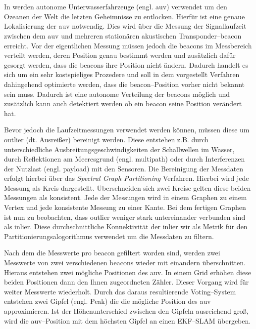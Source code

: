 \section{}

In \cite{olson2004robust} werden autonome Unterwasserfahrzeuge (engl. \gls{auv}) verwendet um den Ozeanen der Welt die letzten Geheimnisse zu entlocken. Hierfür ist eine genaue Lokalisierung der \gls{auv} notwendig. Dies wird über die Messung der Signallaufzeit zwischen dem \gls{auv} und mehreren stationären akustischen Transponder--\Gls{beacon} erreicht. Vor der eigentlichen Messung müssen jedoch die \Glspl{beacon} im Messbereich verteilt werden, deren Position genau bestimmt werden und zusätzlich dafür gesorgt werden, dass die \Glspl{beacon} ihre Position nicht ändern. Dadurch handelt es sich um ein sehr kostspieliges Prozedere und soll in dem vorgestellt Verfahren dahingehend optimierte werden, dass die \Gls{beacon}--Position vorher nicht bekannt sein muss. Dadurch ist eine autonome Verteilung der \Glspl{beacon} möglich und zusätzlich kann auch detektiert werden ob ein \Gls{beacon} seine Position verändert hat.

Bevor jedoch die Laufzeitmessungen verwendet werden können, müssen diese um \Gls{outlier} (dt. Ausreißer) bereinigt werden. Diese entstehen z.B. durch unterschiedliche Ausbreitungsgeschwindigkeiten der Schallwellen im Wasser, durch Reflektionen am Meeresgrund (engl. \Gls{multipath}) oder durch Interferenzen der Nutzlast (engl. \Gls{payload}) mit den Sensoren. Die Bereinigung der Messdaten erfolgt hierbei über das \textit{Spectral Graph Partitioning} Verfahren. Hierbei wird jede Messung als Kreis dargestellt. Überschneiden sich zwei Kreise gelten diese beiden Messungen als konsistent. Jede der Messungen wird in einem Graphen zu einem Vertex und jede konsistente Messung zu einer Kante. Bei dem fertigen Graphen ist nun zu beobachten, dass \Gls{outlier} weniger stark untereinander verbunden sind als \Gls{inlier}. Diese durchschnittliche Konnektivität der \Gls{inlier} wir als Metrik für den Partitionierungsalogorithmus verwendet um die Messdaten zu filtern.

Nach dem die Messwerte pro \Gls{beacon} gefiltert worden sind, werden zwei Messwerte von zwei verschiedenen \Glspl{beacon} wieder mit einandern überschnitten. Hieraus entstehen zwei mögliche Positionen des \gls{auv}. In einem Grid erhöhen diese beiden Positionen dann den Ihnen zugeordneten Zähler. Dieser Vorgang wird für weiter Messwerte wiederholt. Durch das daraus resultierende Voting--System entstehen zwei Gipfel (engl. Peak) die die mögliche Position des \gls{auv} approximieren. Ist der Höhenunterschied zwischen den Gipfeln ausreichend groß, wird die \gls{auv}--Position mit dem höchsten Gipfel an einen EKF--SLAM übergeben.


